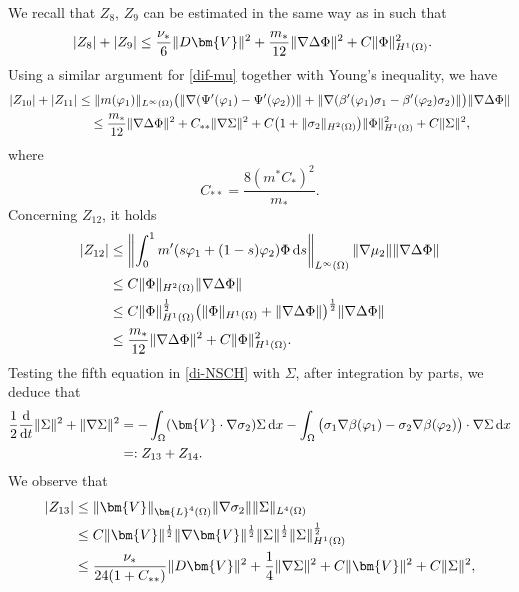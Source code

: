 \documentclass[11pt,reqno]{amsart}
\def\d{{\rm d}}
\def\L{\bm{L}}
\begin{document}
%
We recall that $Z_8$, $Z_9$ can be estimated in the same way as in \cite[Section 6]{Gior2021} such that
%
\begin{align}
|Z_8|+|Z_9|
&\leq
\frac{\nu_*}{6}\|D\bm{V}\|^2
+ \frac{m_*}{12} \|\nabla \Delta \Phi\|^2
+ C\|\Phi\|_{H^1(\Omega)}^2.
\notag
\end{align}
%
Using a similar argument for \eqref{dif-mu} together with Young's inequality, we have
%
\begin{align}
|Z_{10}|+|Z_{11}|
&
\leq \|m(\varphi_1)\|_{L^\infty(\Omega)} \big(\|\nabla (\Psi'(\varphi_1)-\Psi'(\varphi_2))\|
  + \|\nabla (\beta'(\varphi_1) \sigma_1-\beta'(\varphi_2) \sigma_2)\|\big)\|\nabla \Delta \Phi\|
\notag\\
&\quad \leq \frac{m_*}{12} \|\nabla \Delta \Phi\|^2
+ C_{**}\|\nabla \Sigma\|^2
+ C\big(1+\|\sigma_2\|_{H^2(\Omega)}\big) \|\Phi\|_{H^1(\Omega)}^2 + C\|\Sigma\|^2,
\notag
\end{align}
where
$$
C_{**}=\frac{8(m^*C_*)^2}{m_*}.
$$
%
Concerning $Z_{12}$, it holds
\begin{align}
 |Z_{12}|&\leq   \left\|\int_0^1 m'(s\varphi_1+(1-s)\varphi_2)\Phi\,\d s\right\|_{L^\infty(\Omega)}\|\nabla \mu_2\|\|\nabla \Delta \Phi\|
 \notag\\
 &\leq C\|\Phi\|_{H^2(\Omega)}\|\nabla \Delta \Phi\|
 \notag\\
 &\leq C\|\Phi\|_{H^1(\Omega)}^\frac12\big(\|\Phi\|_{H^1(\Omega)}+ \|\nabla \Delta \Phi\|\big)^\frac12 \|\nabla \Delta \Phi\|
 \notag\\
 &\leq  \frac{m_*}{12} \|\nabla \Delta \Phi\|^2
 + C\|\Phi\|_{H^1(\Omega)}^2.
 \notag
\end{align}
%
Testing the fifth equation in \eqref{di-NSCH} with $ \Sigma$, after integration by parts, we deduce that
%
\begin{align}
\frac{1}{2} \frac{\mathrm{d}}{\mathrm{d} t}\|\Sigma\|^2 + \|\nabla \Sigma \|^2
& = - \int_{\Omega} (\bm{V}  \cdot \nabla \sigma_2)  \Sigma \, \mathrm{d} x
-\int_\Omega \big(\sigma_1\nabla \beta(\varphi_1)-\sigma_2\nabla\beta(\varphi_2)\big)\cdot \nabla \Sigma\,\d x
\notag\\
&=: Z_{13}+Z_{14}.
\label{dif-sig}
\end{align}
%
We observe that
%
\begin{align}
|Z_{13}|& \le \|\bm{V}\|_{\L^4(\Omega)}\|\nabla\sigma_2\| \|\Sigma\|_{L^4(\Omega)}
\notag\\
&\leq C\|\bm{V}\|^\frac12 \|\nabla \bm{V}\|^\frac12 \|\Sigma\|^\frac12 \|\Sigma\|_{H^1(\Omega)}^\frac12
\notag\\
&\leq \frac{\nu_*}{24(1+C_{**})}\|D\bm{V}\|^2
+ \frac{1}{4}\|\nabla \Sigma\|^2
+ C\|\bm{V}\|^2 +C\|\Sigma\|^2,
\notag
\end{align}
\end{document}

